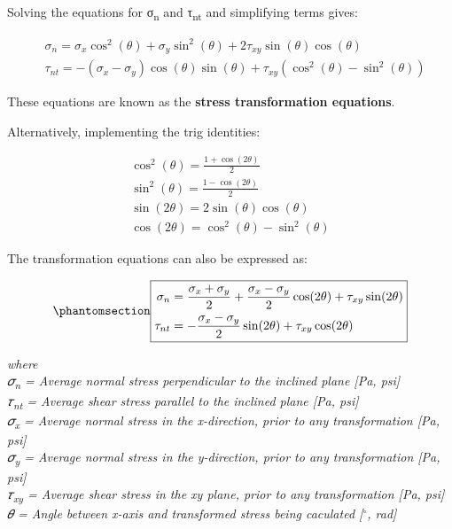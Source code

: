 \documentclass[
  letterpaper,
  DIV=11,
  numbers=noendperiod]{scrreprt}
\theoremstyle{definition}
\theoremstyle{remark}
\begin{document}
Solving the equations for σ\textsubscript{n} and τ\textsubscript{nt} and
simplifying terms gives:

\[
\begin{aligned}
& \sigma_n=\sigma_x \cos ^2(\theta)+\sigma_y \sin ^2(\theta)+2 \tau_{x y} \sin (\theta) \cos (\theta) \\
& \tau_{n t}=-\left(\sigma_x-\sigma_y\right) \cos (\theta) \sin (\theta)+\tau_{x y}\left(\cos ^2(\theta)-\sin ^2(\theta)\right)
\end{aligned}
\]

These equations are known as the \textbf{stress transformation
equations}.

Alternatively, implementing the trig identities:

\[
\begin{gathered}
\cos ^2(\theta)=\frac{1+\cos (2 \theta)}{2} \\
\sin ^2(\theta)=\frac{1-\cos (2 \theta)}{2} \\
\sin (2 \theta)=2 \sin (\theta) \cos (\theta) \\
\cos (2 \theta)=\cos ^2(\theta)-\sin ^2(\theta)
\end{gathered}
\]

The transformation equations can also be expressed as:

\begin{equation}\phantomsection\label{eq-12.1}{
\boxed{\begin{aligned}
\sigma_n & =\frac{\sigma_x+\sigma_y}{2}+\frac{\sigma_x-\sigma_y}{2} \cos (2 \theta)+\tau_{x y} \sin (2 \theta) \\
\tau_{n t} & =-\frac{\sigma_x-\sigma_y}{2} \sin (2 \theta)+\tau_{x y} \cos (2 \theta)
\end{aligned}}
}\end{equation}

\emph{where}\\
\emph{𝜎\textsubscript{n} = Average normal stress perpendicular to the
inclined plane {[}Pa, psi{]}}\\
\emph{𝜏\textsubscript{nt} = Average shear stress parallel to the
inclined plane {[}Pa, psi{]}}\\
\emph{𝜎\textsubscript{x} = Average normal stress in the x-direction,
prior to any transformation {[}Pa, psi{]}}\\
\emph{𝜎\textsubscript{y} = Average normal stress in the y-direction,
prior to any transformation {[}Pa, psi{]}}\\
\emph{𝜏\textsubscript{xy} = Average shear stress in the xy plane, prior
to any transformation {[}Pa, psi{]}}\\
\emph{𝜃 = Angle between x-axis and transformed stress being caculated
{[}}\(^\circ\)\emph{, rad{]}}
\end{document}
